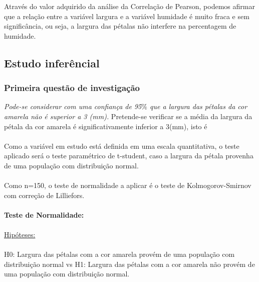 \documentclass{article}
\begin{document}
Através do valor adquirido da análise da Correlação de Pearson, podemos afirmar que a relação entre a variável largura e a variável humidade é muito fraca e sem significância, ou seja, a largura das pétalas não interfere na percentagem de humidade.

\paragraph{}


\subsection{Estudo inferêncial}
\subsubsection{Primeira questão de investigação}
\textit{Pode-se considerar com uma confiança de 95$\%$ que a largura das pétalas  da cor amarela não é superior a 3 (mm).}
Pretende-se verificar se a média da largura da pétala da cor amarela é significativamente inferior a 3(mm), isto é \mu {} 
\paragraph{} Como a variável em estudo está definida em uma escala quantitativa, o teste aplicado será o teste paramétrico de t-student, caso a largura da pétala provenha de uma população com distribuição normal.
\paragraph{} Como n=150, o teste de normalidade a aplicar é o teste de Kolmogorov-Smirnov com correção de Lilliefors.
\paragraph{} 
\textbf{Teste de Normalidade:}
\paragraph{}
\underline{Hipóteses:}
\paragraph{} H0: Largura das pétalas com a cor amarela provém de uma população com distribuição normal vs H1: Largura das pétalas com a cor amarela não provém de uma população com distribuição normal.
\end{document}
